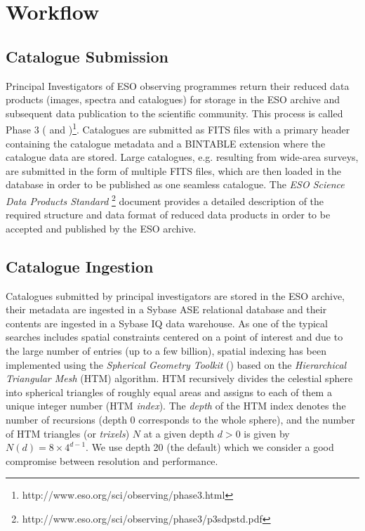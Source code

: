 \section{Workflow}
\subsection{Catalogue Submission}
Principal Investigators of ESO observing programmes return their reduced data products (images, spectra and catalogues) for storage in the ESO archive and subsequent data publication to the scientific community. This process is called Phase 3 (\citet{phase3} and \citet{messenger})\footnote{http://www.eso.org/sci/observing/phase3.html}. Catalogues are submitted as FITS files with a primary header containing the catalogue metadata and a BINTABLE extension where the catalogue data are stored. Large catalogues, e.g. resulting from wide-area surveys, are submitted in the form of multiple FITS files, which are then loaded in the database in order to be published as one seamless catalogue. The \textit{ESO Science Data Products Standard} \footnote{http://www.eso.org/sci/observing/phase3/p3sdpstd.pdf} document provides a detailed description of the required structure and data format of reduced data products in order to be accepted and published by the ESO archive.

\subsection{Catalogue Ingestion}
Catalogues submitted by principal investigators are stored in the ESO archive, their metadata are ingested in a Sybase ASE relational database and their contents are ingested in a Sybase IQ data warehouse. As one of the typical searches includes spatial constraints centered on a point of interest and due to the large number of entries (up to a few billion), spatial indexing has been implemented using the \textit{Spherical Geometry Toolkit} (\citet{spherical}) based on the \textit{Hierarchical Triangular Mesh} (HTM) algorithm. HTM recursively divides the celestial sphere into spherical triangles of roughly equal areas and assigns to each of them a unique integer number (HTM \textit{index}). The \textit{depth} of the HTM index denotes the number of recursions (depth 0 corresponds to the whole sphere), and the number of HTM triangles (or \textit{trixels}) $N$ at a given depth $d>0$ is given by $N(d) = 8\times{4^{d-1}}$. We use depth 20 (the default) which we consider a good compromise between resolution and performance.

